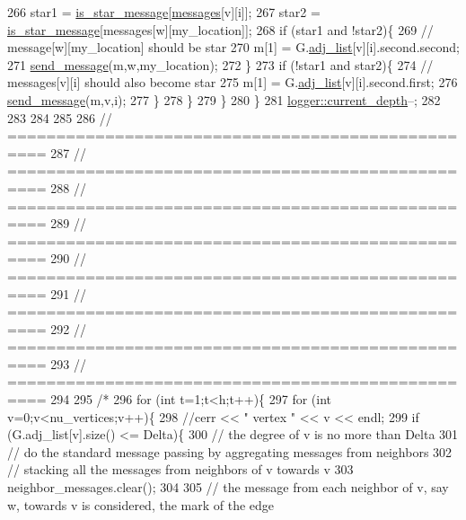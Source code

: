 \begin{DoxyCode}
266         star1 = \hyperlink{classgraph__message_a55ff5531a0043106369e84a7bc45e22d}{is\_star\_message}[\hyperlink{classgraph__message_af680c8a1755cf8d4aba389c1a3d6634e}{messages}[v][i]];
267         star2 = \hyperlink{classgraph__message_a55ff5531a0043106369e84a7bc45e22d}{is\_star\_message}[messages[w][my\_location]];
268         \textcolor{keywordflow}{if} (star1 and !star2)\{
269           \textcolor{comment}{// message[w][my\_location] should be star}
270           m[1] = G.\hyperlink{classmarked__graph_a1a0bf7ca413a278763f7c878b3b6fd6f}{adj\_list}[v][i].second.second;
271           \hyperlink{classgraph__message_aa76d1d5420a12477fa1dddd878d78c8f}{send\_message}(m,w,my\_location);
272         \}
273         \textcolor{keywordflow}{if} (!star1 and star2)\{
274           \textcolor{comment}{// messages[v][i] should also become star}
275           m[1] = G.\hyperlink{classmarked__graph_a1a0bf7ca413a278763f7c878b3b6fd6f}{adj\_list}[v][i].second.first;
276           \hyperlink{classgraph__message_aa76d1d5420a12477fa1dddd878d78c8f}{send\_message}(m,v,i);
277         \}
278       \}
279     \}
280   \}
281   \hyperlink{classlogger_a9d29b49bd318a719a8e85b59eac54fe0}{logger::current\_depth}--;
282 
283 
284 
285 
286   \textcolor{comment}{// ==================================================}
287   \textcolor{comment}{// ==================================================}
288   \textcolor{comment}{// ==================================================}
289   \textcolor{comment}{// ==================================================}
290   \textcolor{comment}{// ==================================================}
291   \textcolor{comment}{// ==================================================}
292   \textcolor{comment}{// ==================================================}
293   \textcolor{comment}{// ==================================================}
294 
295   \textcolor{comment}{/*}
296 \textcolor{comment}{  for (int t=1;t<h;t++)\{}
297 \textcolor{comment}{    for (int v=0;v<nu\_vertices;v++)\{}
298 \textcolor{comment}{      //cerr << " vertex " << v << endl;}
299 \textcolor{comment}{      if (G.adj\_list[v].size() <= Delta)\{}
300 \textcolor{comment}{        // the degree of v is no more than Delta}
301 \textcolor{comment}{        // do the standard message passing by aggregating messages from neighbors}
302 \textcolor{comment}{        // stacking all the messages from neighbors of v towards v}
303 \textcolor{comment}{        neighbor\_messages.clear();}
304 \textcolor{comment}{}
305 \textcolor{comment}{        // the message from each neighbor of v, say w,  towards v is considered, the mark of the edge
}
\end{DoxyCode}
